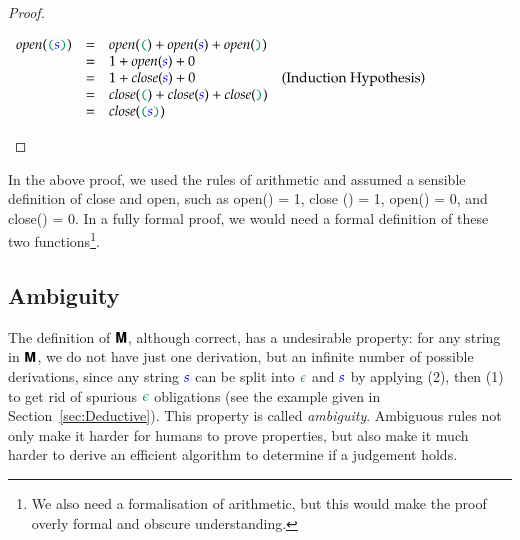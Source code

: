 \documentclass{book}
\begin{document}
\begin{theorem}
\begin{proof}
\begin{description}
  $\begin{array}{lclr}
	\mathit{open}(\mconc{(}\meta{s}\mconc{)}) &=& \mathit{open}(\mconc{(}) + \mathit{open}(\meta{s}) + \mathit{open}(\mconc{)}) \\
                                                  &=& 1  + \mathit{open}(\meta{s}) + 0  \\
                                                  &=& 1  + \mathit{close}(\meta{s}) + 0 & \text{(Induction Hypothesis)} \\
	                                          &=& \mathit{close}(\mconc{(}) + \mathit{close}(\meta{s}) + \mathit{close}(\mconc{)})\\
					          &=& \mathit{close}(\mconc{(}\meta{s}\mconc{)}) 
\end{array}$
\end{description}
\end{proof}
\end{theorem}
\noindent In the above proof, we used the rules of arithmetic and assumed a sensible
definition of \<close\> and \<open\>, such as \<open(\mconc{(}) = 1\>, \<close
(\mconc{)}) = 1\>, \<open(\mconc{)}) = 0\>, and \<close(\mconc{(}) = 0\>. In a fully
formal proof, we would need a formal definition of these two
functions\footnote{We also need a formalisation of arithmetic, but this would make the proof overly formal
  and obscure understanding.}.

\subsection{Ambiguity}
The definition of $\textsf{\textbf{M}}$, although correct, has a undesirable property: for
any string in $\textsf{\textbf{M}}$, we do not have just one derivation, but an
infinite number of possible derivations, since any string $\textcolor{blue}{s}$ can be split
into  $\conc{\epsilon}$ and $\textcolor{blue}{s}$ by applying (2), then (1) to get rid of
 spurious $\conc{\epsilon}$ obligations (see the example given in
 Section~\ref{sec:Deductive}). This property is called \emph{ambiguity}. Ambiguous rules
 not only make it harder for humans to prove properties, but also make it
 much harder to derive an efficient algorithm to determine if a judgement holds. 
\end{document}
